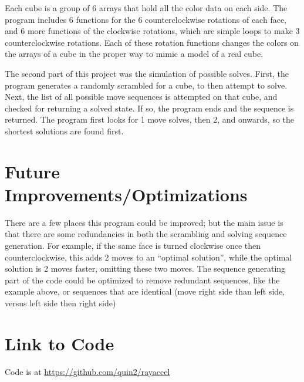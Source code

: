 \documentclass{article}
\begin{document}
Each cube is a group of 6 arrays that hold all the color data on each side. The program includes 6 functions for the 6 counterclockwise rotations of each face, and 6 more functions of the clockwise rotations, which are simple loops to make 3 counterclockwise rotations. Each of these rotation functions changes the colors on the arrays of a cube in the proper way to mimic a model of a real cube. 

The second part of this project was the simulation of possible solves. First, the program generates a randomly scrambled for a cube, to then attempt to solve. Next, the list of all possible move sequences is attempted on that cube, and checked for returning a solved state. If so, the program ends and the sequence is returned. The program first looks for 1 move solves, then 2, and onwards, so the shortest solutions are found first. 



\section{Future Improvements/Optimizations}
There are a few places this program could be improved; but the main issue is that there are some redundancies in both the scrambling and solving sequence generation. For example, if the same face is turned clockwise once then counterclockwise, this adds 2 moves to an “optimal solution”, while the optimal solution is 2 moves faster, omitting these two moves. The sequence generating part of the code could be optimized to remove redundant sequences, like the example above, or sequences that are identical (move right side than left side, versus left side then right side)


%  





\section{Link to Code}
Code is at \href{https://github.com/quin2/rayaccel}{https://github.com/quin2/rayaccel}
\end{document}
